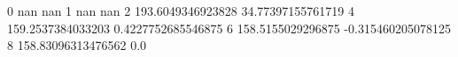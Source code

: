 0 nan nan
1 nan nan
2 193.6049346923828 34.77397155761719
4 159.2537384033203 0.4227752685546875
6 158.5155029296875 -0.315460205078125
8 158.83096313476562 0.0
